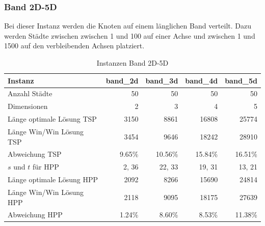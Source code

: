 \documentclass[11pt,a4paper]{article}
\begin{document}
\subsubsection{Band 2D-5D}
Bei dieser Instanz werden die Knoten auf einem länglichen Band verteilt. Dazu werden Städte zwischen zwischen 1 und 100 auf einer Achse und zwischen 1 und 1500 auf den verbleibenden Achsen platziert.

\begin{table}[H]
        \centering
        \begin{tabular}{| l | r | r | r | r |}
            \hline
            Instanz                     & \textbf{band\_2d}     
                                        & \textbf{band\_3d}     
                                        & \textbf{band\_4d}     
                                        & \textbf{band\_5d}             \\ \hline
                Anzahl Städte               & 50        & 50       & 50         & 50        \\ \hline
                Dimensionen                 & 2         & 3        & 4          & 5         \\ \hline
                Länge optimale Lösung TSP   & 3150      & 8861     & 16808      & 25774     \\ \hline
                Länge Win/Win Lösung  TSP   & 3454      & 9646     & 18242      & 28910     \\ \hline
                Abweichung TSP              & 9.65\%    & 10.56\%  & 15.84\%    & 16.51\%   \\ \hline
                $s$ und $t$ für HPP         & 2, 36     & 22, 33   & 19, 31     & 13, 21    \\ \hline
                Länge optimale Lösung HPP   & 2092      & 8266     & 15690      & 24814     \\ \hline
                Länge Win/Win Lösung  HPP   & 2118      & 9095     & 18175      & 27639     \\ \hline
                Abweichung HPP              & 1.24\%    & 8.60\%   & 8.53\%     & 11.38\%   \\ \hline
        \end{tabular}
        \caption{Instanzen Band 2D-5D}
        \label{tab:instanzen_belt}
\end{table}
\end{document}
